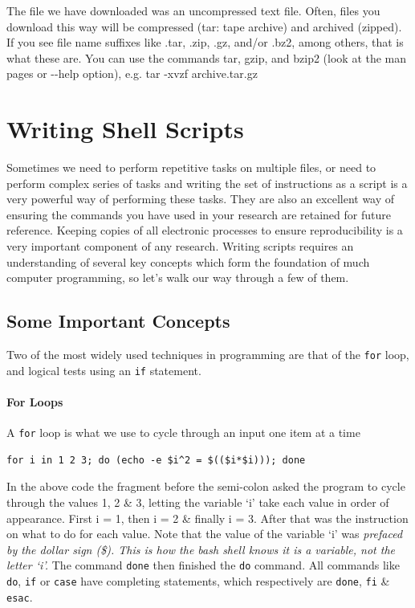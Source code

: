 \documentclass[a4paper,12pt,twoside]{memoir}
\begin{document}
\begin{information}
The file we have downloaded was an uncompressed text file. 
Often, files you download this way will be compressed (tar: tape archive) and archived (zipped). 
If you see file name suffixes like .tar, .zip, .gz, and/or .bz2, among others, that is what these are.  
You can use the commands tar, gzip, and bzip2 (look at the man pages or -{}-help option), e.g. tar -xvzf archive.tar.gz
\end{information}

\chapter{Writing Shell Scripts}
Sometimes we need to perform repetitive tasks on multiple files, or need to perform complex series of tasks and writing the set of instructions as a script is a very powerful way of performing these tasks.
They are also an excellent way of ensuring the commands you have used in your research are retained for future reference.
Keeping copies of all electronic processes to ensure reproducibility is a very important component of any research. 
Writing scripts requires an understanding of several key concepts which form the foundation of much computer programming, so let's walk our way through a few of them. \\

\section{Some Important Concepts}

Two of the most widely used techniques in programming are that of the \texttt{for} loop, and logical tests using an \texttt{if} statement.

\subsubsection*{For Loops}

A \texttt{for} loop is what we use to cycle through an input one item at a time 
\begin{steps}
\begin{lstlisting}
for i in 1 2 3; do (echo -e $i^2 = $(($i*$i))); done
\end{lstlisting}
\end{steps}

\begin{information}
In the above code the fragment before the semi-colon asked the program to cycle through the values 1, 2 \& 3, letting the variable `i' take each value in order of appearance.
First i = 1, then i = 2 \& finally i = 3.
After that was the instruction on what to do for each value.
Note that the value of the variable `i' was \textit{prefaced by the dollar sign (\$).
This is how the bash shell knows it is a variable, not the letter `i'.}
The command \texttt{done} then finished the \texttt{do} command.
All commands like \texttt{do}, \texttt{if} or \texttt{case} have completing statements, which respectively are \texttt{done}, \texttt{fi} \& \texttt{esac}.
\end{information}
\end{document}
